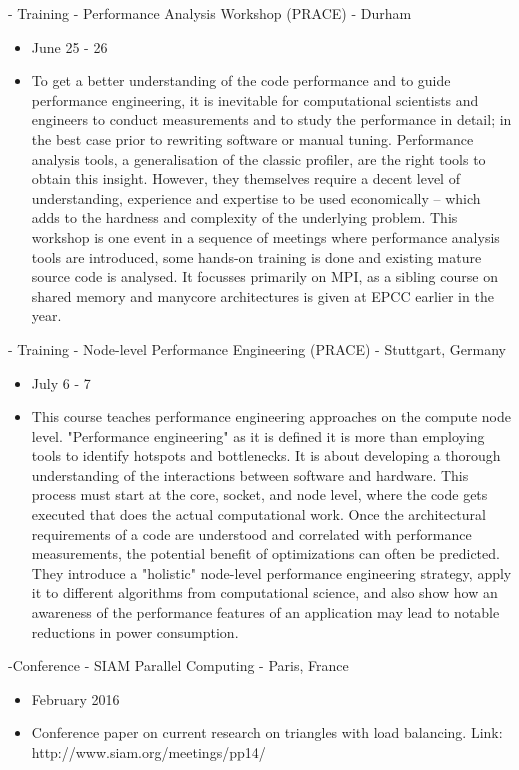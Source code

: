 \documentclass[times,12pt]{ACME2015article}
\begin{document}
- Training - Performance Analysis Workshop (PRACE) -  Durham
\begin{itemize}
\item June 25 - 26
\item To get a better understanding of the code performance and to guide performance engineering, it is inevitable for computational scientists and engineers to conduct measurements and to study the performance in detail; in the best case prior to rewriting software or manual tuning. Performance analysis tools, a generalisation of the classic profiler, are the right tools to obtain this insight. However, they themselves require a decent level of understanding, experience and expertise to be used economically – which adds to the hardness and complexity of the underlying problem. This workshop is one event in a sequence of meetings where performance analysis tools are introduced, some hands-on training is done and existing mature source code is analysed. It focusses primarily on MPI, as a sibling course on shared memory and manycore architectures is given at EPCC earlier in the year.
\end{itemize}

\clearpage

- Training - Node-level Performance Engineering (PRACE) -  Stuttgart, Germany 
\begin{itemize}
\item July 6 - 7
\item This course teaches performance engineering approaches on the compute node level. "Performance engineering" as it is defined it is more than employing tools to identify hotspots and bottlenecks. It is about developing a thorough understanding of the interactions between software and hardware. This process must start at the core, socket, and node level, where the code gets executed that does the actual computational work. Once the architectural requirements of a code are understood and correlated with performance measurements, the potential benefit of optimizations can often be predicted. They introduce a "holistic" node-level performance engineering strategy, apply it to different algorithms from computational science, and also show how an awareness of the performance features of an application may lead to notable reductions in power consumption.
\end{itemize}

-Conference - SIAM Parallel Computing - Paris, France
\begin{itemize}
\item February 2016
\item Conference paper on current research on triangles with load balancing. Link: http://www.siam.org/meetings/pp14/
\end{itemize}
\end{document}
